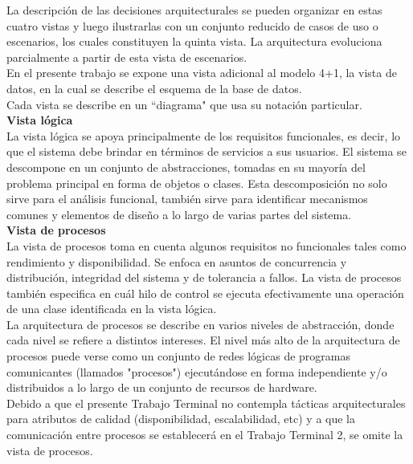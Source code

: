 La descripción de las decisiones arquitecturales se pueden organizar en estas cuatro vistas y luego ilustrarlas con un conjunto reducido de casos de uso o escenarios, los cuales constituyen la quinta vista. La arquitectura evoluciona parcialmente a partir de esta vista de escenarios.\\

En el presente trabajo se expone una vista adicional al modelo 4+1, la vista de datos, en la cual se describe el esquema de la base de datos.\\

Cada vista se describe en un ``diagrama" que usa su notación particular.\\

\textbf{{\large{Vista lógica}}}\\

La vista lógica se apoya principalmente de los requisitos funcionales, es decir, lo que el sistema debe brindar en términos de servicios a sus usuarios. El sistema se descompone en un conjunto de abstracciones, tomadas en su mayoría del problema principal en forma de objetos o clases. Esta descomposición no solo sirve para el análisis funcional, también sirve para identificar mecanismos comunes y elementos de diseño a lo largo de varias partes del sistema.\\

\textbf{{\large{Vista de procesos}}}\\

La vista de procesos toma en cuenta algunos requisitos no funcionales tales como rendimiento y disponibilidad. Se enfoca en asuntos de concurrencia y distribución, integridad del sistema y de tolerancia a fallos. La vista de procesos también especifica en cuál hilo de control se ejecuta efectivamente una operación de una clase identificada en la vista lógica.\\

La arquitectura de procesos se describe en varios niveles de abstracción, donde cada nivel se refiere a distintos intereses. El nivel más alto de la arquitectura de procesos puede verse como un conjunto de redes lógicas de programas comunicantes (llamados "procesos") ejecutándose en forma independiente y/o distribuidos a lo largo de un conjunto de recursos de hardware.\\

Debido a que el presente Trabajo Terminal no contempla tácticas arquitecturales para atributos de calidad (disponibilidad, escalabilidad, etc) y a que la comunicación entre procesos se establecerá en el Trabajo Terminal 2, se omite la vista de procesos.\\

